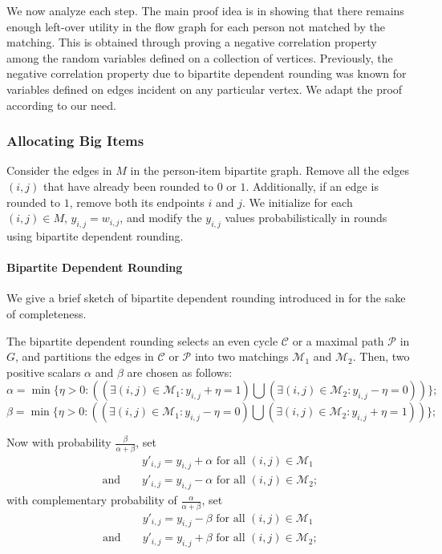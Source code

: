 \bigskip


We now analyze each step. The main proof idea is in showing that there remains enough left-over utility in the flow graph for each person
not matched by the matching. This is obtained through proving a negative correlation property among the random variables
defined on a collection of vertices. Previously, the negative correlation property due to bipartite dependent
rounding was known for variables defined on edges incident on any particular vertex. We adapt the proof according to our need.

\subsubsection{Allocating Big Items}
\label{subsec:match}
Consider the edges in $M$ in the person-item bipartite graph. Remove all the edges $(i,j)$ that have already been rounded to $0$ or $1$. Additionally, if an edge is rounded to $1$, remove both its endpoints $i$ and $j$.  We initialize for each $(i,j) \in M$, $y_{i,j}=w_{i,j}$, and modify the $y_{i,j}$ values probabilistically in rounds using bipartite dependent rounding.


\paragraph{{\bf Bipartite Dependent Rounding}\cite{gkps:dep-round}}
\label{subsec:bipartite}
 We give a brief sketch of bipartite dependent rounding introduced in \cite{gkps:dep-round} for the sake of completeness.

  The bipartite dependent rounding selects an even cycle $\mathcal{C}$ or a maximal path $\mathcal{P}$ in $G$, and partitions the edges in $\mathcal{C}$ or $\mathcal{P}$ into two matchings $\mathcal{M}_{1}$ and $\mathcal{M}_{2}$. Then, two positive scalars $\alpha$ and $\beta$ are chosen as follows:
 $$\alpha =\min\{\eta > 0: ((\exists(i,j) \in \mathcal{M}_{1}: y_{i,j}+\eta=1) \bigcup(\exists(i,j) \in \mathcal{M}_{2}: y_{i,j}-\eta=0))\};$$
 $$\beta =\min\{\eta > 0: ((\exists(i,j) \in \mathcal{M}_{1}: y_{i,j}-\eta=0)\bigcup(\exists(i,j) \in \mathcal{M}_{2}: y_{i,j}+\eta=1))\};$$

Now with probability $\frac{\beta}{\alpha+\beta}$, set
\begin{eqnarray*}
&& y'_{i,j}=y_{i,j}+\alpha \text{ for all } (i,j) \in \mathcal{M}_{1} \\
\text{ and } && y'_{i,j}=y_{i,j}-\alpha \text{ for all } (i,j) \in \mathcal{M}_{2};
\end{eqnarray*}
with complementary probability of $\frac{\alpha}{\alpha+\beta}$, set
\begin{eqnarray*}
&& y'_{i,j}=y_{i,j}-\beta \text{ for all } (i,j) \in \mathcal{M}_{1} \\
\text{ and }&& y'_{i,j}=y_{i,j}+\beta \text{ for all } (i,j) \in \mathcal{M}_{2};
\end{eqnarray*}

